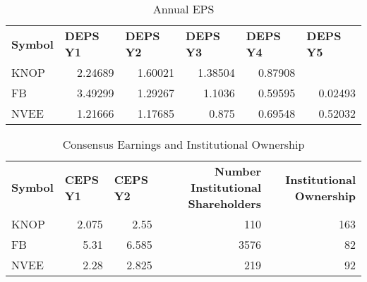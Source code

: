 \documentclass{article}
\begin{document}
\begin{table}[htbp]
  \caption{Annual EPS}
      \begin{tabular}{lrrrrr}
    \textbf{Symbol} & \multicolumn{1}{l}{\textbf{DEPS Y1}} & \multicolumn{1}{l}{\textbf{DEPS Y2}} & \multicolumn{1}{l}{\textbf{DEPS Y3}} & \multicolumn{1}{l}{\textbf{DEPS Y4}} & \multicolumn{1}{l}{\textbf{DEPS Y5}} \\
    KNOP  & 2.24689 & 1.60021 & 1.38504 & 0.87908 &  \\
    FB    & 3.49299 & 1.29267 & 1.1036 & 0.59595 & 0.02493 \\
    NVEE  & 1.21666 & 1.17685 & 0.875 & 0.69548 & 0.52032 \\
    \end{tabular}%
  \label{tab:addlabel}%
\end{table}%

\begin{table}[htbp]
  \caption{Consensus Earnings and Institutional Ownership}
    \begin{tabular}{lrrrr}
    \textbf{Symbol} & \multicolumn{1}{l}{\textbf{CEPS Y1}} & \multicolumn{1}{l}{\textbf{CEPS Y2}} & \multicolumn{1}{p{4.215em}}{\textbf{Number Institutional Shareholders}} & \multicolumn{1}{p{4.215em}}{\textbf{Institutional Ownership}} \\
    KNOP  & 2.075 & 2.55  & 110   & 163 \\
    FB    & 5.31  & 6.585 & 3576  & 82 \\
    NVEE  & 2.28  & 2.825 & 219   & 92 \\
    \end{tabular}%
  \label{tab:addlabel}%
\end{table}%
\end{document}
